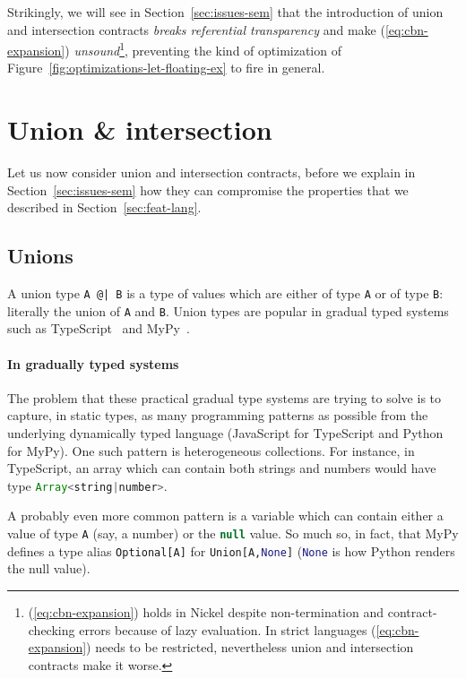 \documentclass[sigplan,screen,10pt]{acmart}
\newcommand{\nickel}[1]{\lstinline[language=nickel]{#1}}
\newcommand{\typescript}[1]{\lstinline[language=JavaScript]{#1}}
\newcommand{\python}[1]{\lstinline[language=Python]{#1}}
\begin{document}
Strikingly, we will see in Section~\ref{sec:issues-sem} that the introduction of
union and intersection contracts \emph{breaks referential transparency} and make
(\ref{eq:cbn-expansion}) \emph{unsound}\footnote{(\ref{eq:cbn-expansion}) holds
  in Nickel despite non-termination and contract-checking errors
  because of lazy evaluation. In strict languages (\ref{eq:cbn-expansion}) needs to be restricted, nevertheless
  union and intersection contracts make it worse.}, preventing the kind of optimization of
Figure~\ref{fig:optimizations-let-floating-ex} to fire in general.

\section{Union \& intersection}
\label{sec:union-inter}

Let us now consider union and intersection contracts, before we explain in
Section~\ref{sec:issues-sem} how they can compromise the properties that we
described in Section~\ref{sec:feat-lang}.

\subsection{Unions}

A union type \nickel{A @| B} is a type of values which are either of
type \nickel{A} or of type \nickel{B}: literally the union of
\nickel{A} and \nickel{B}. Union types are popular in gradual typed
systems such as TypeScript~\cite{TypeScriptUnions} and
MyPy~\cite{MyPyOptional}.

\paragraph{In gradually typed systems}

The problem that these practical gradual type systems are trying to solve is to
capture, in static types, as many programming patterns as possible
from the underlying dynamically typed language (JavaScript for
TypeScript and Python for MyPy). One such pattern is
heterogeneous collections. For instance, in TypeScript, an array
which can contain both strings and numbers would have type
\typescript{Array<string|number>}.

A probably even more common pattern is a variable which can contain
either a value of type \typescript{A} (say, a number) or the \typescript{null}
value. So much so, in fact, that MyPy defines a type alias
\python{Optional[A]} for \python{Union[A,None]} (\python{None} is how
Python renders the null value).
\end{document}
